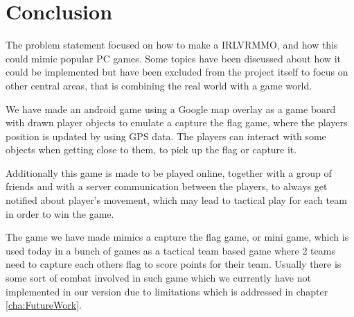 \chapter{Conclusion}
The problem statement focused on how to make a IRLVRMMO, and how this could mimic popular PC games. Some topics have been discussed about how it could be implemented but have been excluded from the project itself to focus on other central areas, that is combining the real world with a game world.

We have made an android game using a Google map overlay as a game board with drawn player objects to emulate a capture the flag game, where the players position is updated by using GPS data. The players can interact with some objects when getting close to them, to pick up the flag or capture it.

Additionally this game is made to be played online, together with a group of friends and with a server communication between the players, to always get notified about player's movement, which may lead to tactical play for each team in order to win the game.

The game we have made mimics a capture the flag game, or mini game, which is used today in a bunch of games as a tactical team based game where 2 teams need to capture each others flag to score points for their team. Usually there is some sort of combat involved in such game which we currently have not implemented in our version due to limitations which is addressed in chapter \ref{cha:FutureWork}.